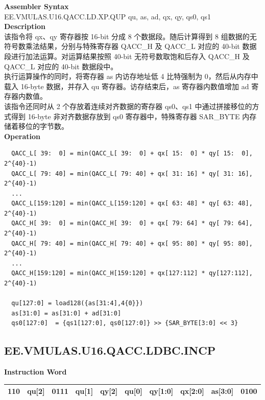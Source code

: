 \textbf{Assembler Syntax} \\
EE.VMULAS.U16.QACC.LD.XP.QUP qu, as, ad, qx, qy, qs0, qs1 \\
\textbf{Description} \\
该指令将 qx、qy 寄存器按 16-bit 分成 8 个数据段。随后计算得到 8 组数据的无符号数乘法结果，分别与特殊寄存器 QACC\_H 及 QACC\_L 对应的 40-bit 数据段进行加法运算。对运算结果按照 40-bit 无符号数取饱和后存入 QACC\_H 及 QACC\_L 对应的 40-bit 数据段中。\\
执行运算操作的同时，将寄存器 as 内访存地址低 4 比特强制为 0，然后从内存中载入 16-byte 数据，并存入 qu 寄存器。访存结束后，as 寄存器内数值增加 ad 寄存器内数值。\\
该指令还同时从 2 个存放着连续对齐数据的寄存器 qs0、qs1 中通过拼接移位的方式得到 16-byte 非对齐数据存放到 qs0 寄存器中，特殊寄存器 SAR\_BYTE 内存储着移位的字节数。\\
\textbf{Operation}
\begin{lstlisting}
  QACC_L[ 39:  0] = min(QACC_L[ 39:  0] + qx[ 15:  0] * qy[ 15:  0], 2^{40}-1)
  QACC_L[ 79: 40] = min(QACC_L[ 79: 40] + qx[ 31: 16] * qy[ 31: 16], 2^{40}-1)
  ...
  QACC_L[159:120] = min(QACC_L[159:120] + qx[ 63: 48] * qy[ 63: 48], 2^{40}-1)
  QACC_H[ 39:  0] = min(QACC_H[ 39:  0] + qx[ 79: 64] * qy[ 79: 64], 2^{40}-1)
  QACC_H[ 79: 40] = min(QACC_H[ 79: 40] + qx[ 95: 80] * qy[ 95: 80], 2^{40}-1)
  ...
  QACC_H[159:120] = min(QACC_H[159:120] + qx[127:112] * qy[127:112], 2^{40}-1)

  qu[127:0] = load128({as[31:4],4{0}})
  as[31:0] = as[31:0] + ad[31:0]
  qs0[127:0]  = {qs1[127:0], qs0[127:0]} >> {SAR_BYTE[3:0] << 3}
\end{lstlisting}

\clearpage
\subsection{EE.VMULAS.U16.QACC.LDBC.INCP}\label{instruction:EEVMULASU16QACCLDBCINCP}
\setlength\tabcolsep{6pt}
\textbf{Instruction Word} \\
\begin{tabular}{|c|c|c|c|c|c|c|c|c|c|}
	\hline
	110 & qu[2] & 0111 & qu[1] & qy[2] & qu[0] & qy[1:0] & qx[2:0] & as[3:0] & 0100 \\
	\hline
\end{tabular}

